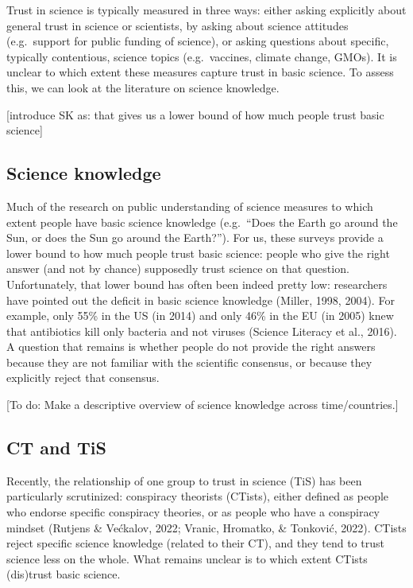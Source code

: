 \documentclass[
  doc,floatsintext]{apa6}
\begin{document}
Trust in science is typically measured in three ways: either asking explicitly about general trust in science or scientists, by asking about science attitudes (e.g.~support for public funding of science), or asking questions about specific, typically contentious, science topics (e.g.~vaccines, climate change, GMOs). It is unclear to which extent these measures capture trust in basic science. To assess this, we can look at the literature on science knowledge.

{[}introduce SK as: that gives us a lower bound of how much people trust basic science{]}

\subsection{Science knowledge}\label{science-knowledge}

Much of the research on public understanding of science measures to which extent people have basic science knowledge (e.g.~``Does the Earth go around the Sun, or does the Sun go around the Earth?''). For us, these surveys provide a lower bound to how much people trust basic science: people who give the right answer (and not by chance) supposedly trust science on that question. Unfortunately, that lower bound has often been indeed pretty low: researchers have pointed out the deficit in basic science knowledge (Miller, 1998, 2004). For example, only 55\% in the US (in 2014) and only 46\% in the EU (in 2005) knew that antibiotics kill only bacteria and not viruses (Science Literacy et al., 2016). A question that remains is whether people do not provide the right answers because they are not familiar with the scientific consensus, or because they explicitly reject that consensus.

{[}To do: Make a descriptive overview of science knowledge across time/countries.{]}

\subsection{CT and TiS}\label{ct-and-tis}

Recently, the relationship of one group to trust in science (TiS) has been particularly scrutinized: conspiracy theorists (CTists), either defined as people who endorse specific conspiracy theories, or as people who have a conspiracy mindset (Rutjens \& Većkalov, 2022; Vranic, Hromatko, \& Tonković, 2022). CTists reject specific science knowledge (related to their CT), and they tend to trust science less on the whole. What remains unclear is to which extent CTists (dis)trust basic science.
\end{document}

